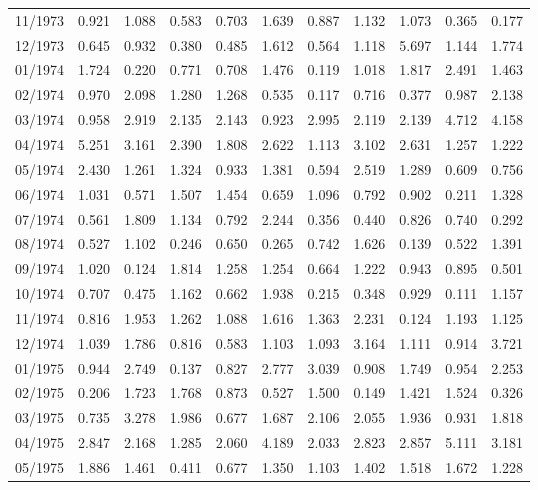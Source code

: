 \begin{tabular}{lrrrrrrrrrr}
11/1973 &  0.921 &  1.088 &  0.583 &  0.703 &  1.639 &  0.887 &  1.132 &  1.073 &  0.365 &  0.177 \\
12/1973 &  0.645 &  0.932 &  0.380 &  0.485 &  1.612 &  0.564 &  1.118 &  5.697 &  1.144 &  1.774 \\
01/1974 &  1.724 &  0.220 &  0.771 &  0.708 &  1.476 &  0.119 &  1.018 &  1.817 &  2.491 &  1.463 \\
02/1974 &  0.970 &  2.098 &  1.280 &  1.268 &  0.535 &  0.117 &  0.716 &  0.377 &  0.987 &  2.138 \\
03/1974 &  0.958 &  2.919 &  2.135 &  2.143 &  0.923 &  2.995 &  2.119 &  2.139 &  4.712 &  4.158 \\
04/1974 &  5.251 &  3.161 &  2.390 &  1.808 &  2.622 &  1.113 &  3.102 &  2.631 &  1.257 &  1.222 \\
05/1974 &  2.430 &  1.261 &  1.324 &  0.933 &  1.381 &  0.594 &  2.519 &  1.289 &  0.609 &  0.756 \\
06/1974 &  1.031 &  0.571 &  1.507 &  1.454 &  0.659 &  1.096 &  0.792 &  0.902 &  0.211 &  1.328 \\
07/1974 &  0.561 &  1.809 &  1.134 &  0.792 &  2.244 &  0.356 &  0.440 &  0.826 &  0.740 &  0.292 \\
08/1974 &  0.527 &  1.102 &  0.246 &  0.650 &  0.265 &  0.742 &  1.626 &  0.139 &  0.522 &  1.391 \\
09/1974 &  1.020 &  0.124 &  1.814 &  1.258 &  1.254 &  0.664 &  1.222 &  0.943 &  0.895 &  0.501 \\
10/1974 &  0.707 &  0.475 &  1.162 &  0.662 &  1.938 &  0.215 &  0.348 &  0.929 &  0.111 &  1.157 \\
11/1974 &  0.816 &  1.953 &  1.262 &  1.088 &  1.616 &  1.363 &  2.231 &  0.124 &  1.193 &  1.125 \\
12/1974 &  1.039 &  1.786 &  0.816 &  0.583 &  1.103 &  1.093 &  3.164 &  1.111 &  0.914 &  3.721 \\
01/1975 &  0.944 &  2.749 &  0.137 &  0.827 &  2.777 &  3.039 &  0.908 &  1.749 &  0.954 &  2.253 \\
02/1975 &  0.206 &  1.723 &  1.768 &  0.873 &  0.527 &  1.500 &  0.149 &  1.421 &  1.524 &  0.326 \\
03/1975 &  0.735 &  3.278 &  1.986 &  0.677 &  1.687 &  2.106 &  2.055 &  1.936 &  0.931 &  1.818 \\
04/1975 &  2.847 &  2.168 &  1.285 &  2.060 &  4.189 &  2.033 &  2.823 &  2.857 &  5.111 &  3.181 \\
05/1975 &  1.886 &  1.461 &  0.411 &  0.677 &  1.350 &  1.103 &  1.402 &  1.518 &  1.672 &  1.228 \\

\end{tabular}
